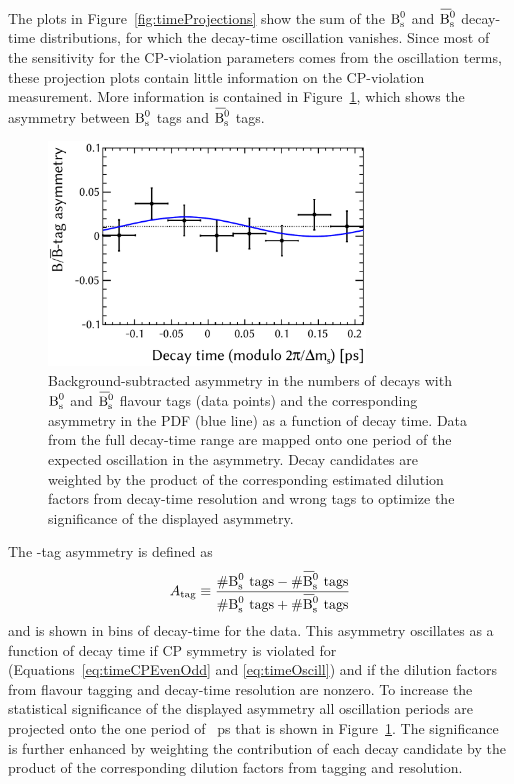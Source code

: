 The plots in Figure~\ref{fig:timeProjections} show the sum of the $\text{B}_\text{s}^\text{0}$ and $\Bsbar$ decay-time distributions, for which the decay-time
oscillation vanishes. Since most of the sensitivity for the CP-violation parameters comes from the oscillation terms, these projection
plots contain little information on the CP-violation measurement. More information is contained in Figure~\ref{fig:BBbarAsymmetry}, which
shows the asymmetry between $\text{B}_\text{s}^\text{0}$ tags and $\Bsbar$ tags.
\begin{figure}[htb]
  \centering
  \includegraphics[width=0.75\textwidth]{graphics/results/asym}
  \caption{Background-subtracted asymmetry in the numbers of decays with $\text{B}_\text{s}^\text{0}$ and $\Bsbar$ flavour tags (data points)
           and the corresponding asymmetry in the PDF (blue line) as a function of decay time.
           Data from the full decay-time range are mapped onto one period of the expected oscillation in the asymmetry.
           Decay candidates are weighted by the product of the corresponding estimated dilution factors from decay-time resolution
           and wrong tags to optimize the significance of the displayed asymmetry.}
  \label{fig:BBbarAsymmetry}
\end{figure}

The \BsBsbar-tag asymmetry is defined as
\[
  A_{\text{tag}} \equiv \frac{\#\Bs{}\text{ tags} - \#\Bsbar{}\text{ tags}}{\#\Bs{}\text{ tags} + \#\Bsbar{}\text{ tags}}
\]
and is shown in bins of decay-time for the data. This asymmetry oscillates as a function of decay time if CP symmetry is violated for
\BstoJpsiKK{} (Equations~\ref{eq:timeCPEvenOdd} and \ref{eq:timeOscill}) and if the dilution factors from flavour tagging and decay-time
resolution are nonzero. To increase the statistical significance of the displayed asymmetry all oscillation periods are projected onto the
one period of ~ps that is shown in Figure~\ref{fig:BBbarAsymmetry}. The significance is further enhanced by weighting the
contribution of each decay candidate by the product of the corresponding dilution factors from tagging and resolution.

